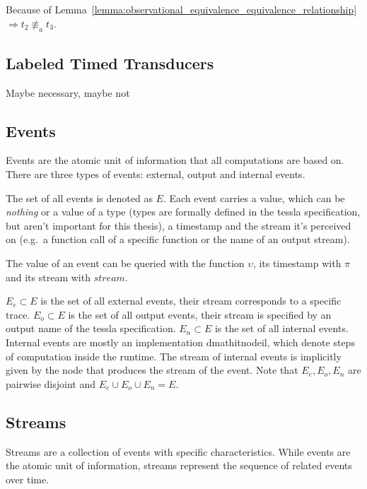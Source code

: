 \begin{exmp}[name=Observational Equivalence]
  Because of Lemma~\ref{lemma:observational_equivalence_equivalence_relationship} \(\Rightarrow t_2 \not\equiv_a t_3\).

\end{exmp}

\subsection{Labeled Timed Transducers}
Maybe necessary, maybe not

\subsection{Events}
\label{sec:concepts:defs:events}

Events are the atomic unit of information that all computations are based on.
There are three types of events: external, output and internal events.

The set of all events is denoted as \(E\).
Each event carries a value, which can be \emph{nothing} or a value of a type (types are formally defined in the \gls{tessla} specification, but aren't important for this thesis), a timestamp and the stream it's perceived on (e.g.\ a function call of a specific function or the name of an output stream).

The value of an event can be queried with the function \(\upsilon\), its timestamp with \(\pi\) and its stream with \(\mathit{stream}\).

\(E_e \subset E\) is the set of all external events, their stream corresponds to a specific trace.
\(E_o \subset E\) is the set of all output events, their stream is specified by an output name of the \gls{tessla} specification.
\(E_n \subset E\) is the set of all internal events.
Internal events are mostly an implementation dmathit{node}il, which denote steps of computation inside the runtime.
The stream of internal events is implicitly given by the node that produces the stream of the event.
Note that \(E_e, E_o, E_n\) are pairwise disjoint and \(E_e \cup E_o \cup E_n = E\).

\subsection{Streams}
\label{sec:concepts:defs:streams}

Streams are a collection of events with specific characteristics.
While events are the atomic unit of information, streams represent the sequence of related events over time.

